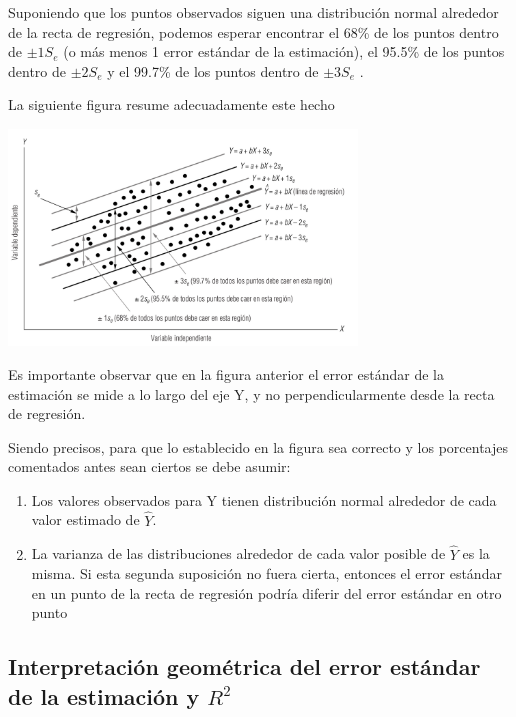 \documentclass[
]{article}
\providecommand{\tightlist}{%
  \setlength{\itemsep}{0pt}\setlength{\parskip}{0pt}}
\begin{document}
Suponiendo que los puntos observados siguen una distribución normal
alrededor de la recta de regresión, podemos esperar encontrar el 68\% de
los puntos dentro de \(\pm 1 S_e\) (o más menos 1 error estándar de la
estimación), el 95.5\% de los puntos dentro de \(\pm 2 S_e\) y el 99.7\%
de los puntos dentro de \(\pm 3 S_e\) .

La siguiente figura resume adecuadamente este hecho

\includegraphics[width=3.64583in,height=\textheight]{error_regression_2.png}

Es importante observar que en la figura anterior el error estándar de la
estimación se mide a lo largo del eje Y, y no perpendicularmente desde
la recta de regresión.

Siendo precisos, para que lo establecido en la figura sea correcto y los
porcentajes comentados antes sean ciertos se debe asumir:

\begin{enumerate}
\def\labelenumi{\arabic{enumi}.}
\tightlist
\item
  Los valores observados para Y tienen distribución normal alrededor de
  cada valor estimado de \(\hat Y\).
\item
  La varianza de las distribuciones alrededor de cada valor posible de
  \(\hat Y\) es la misma. Si esta segunda suposición no fuera cierta,
  entonces el error estándar en un punto de la recta de regresión podría
  diferir del error estándar en otro punto
\end{enumerate}

\hypertarget{interpretaciuxf3n-geomuxe9trica-del-error-estuxe1ndar-de-la-estimaciuxf3n-y-r2}{%
\subsection{\texorpdfstring{Interpretación geométrica del error estándar
de la estimación y
\(R^2\)}{Interpretación geométrica del error estándar de la estimación y R\^{}2}}\label{interpretaciuxf3n-geomuxe9trica-del-error-estuxe1ndar-de-la-estimaciuxf3n-y-r2}}
\end{document}
